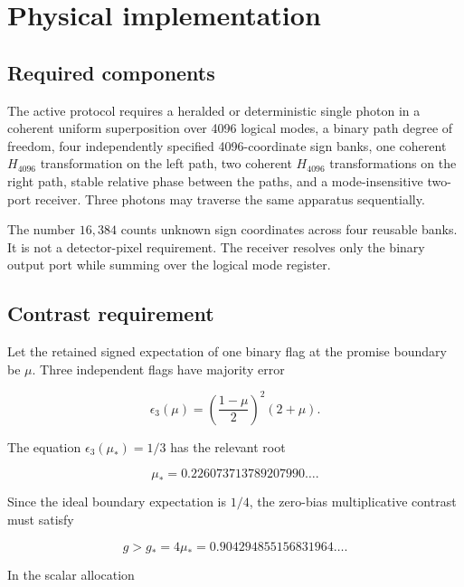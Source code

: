 \section{Physical implementation}
\label{sec:implementation}

\subsection{Required components}

The active protocol requires a heralded or deterministic single photon in a coherent uniform superposition over 4096 logical modes, a binary path degree of freedom, four independently specified 4096-coordinate sign banks, one coherent $H_{4096}$ transformation on the left path, two coherent $H_{4096}$ transformations on the right path, stable relative phase between the paths, and a mode-insensitive two-port receiver. Three photons may traverse the same apparatus sequentially.

The number $16{,}384$ counts unknown sign coordinates across four reusable banks. It is not a detector-pixel requirement. The receiver resolves only the binary output port while summing over the logical mode register.

\subsection{Contrast requirement}

Let the retained signed expectation of one binary flag at the promise boundary be $\mu$. Three independent flags have majority error

\begin{equation}
\epsilon_3(\mu)
=\left(\frac{1-\mu}{2}\right)^2(2+\mu).
\end{equation}

The equation $\epsilon_3(\mu_*)=1/3$ has the relevant root

\begin{equation}
\mu_*=0.226073713789207990\ldots.
\end{equation}

Since the ideal boundary expectation is $1/4$, the zero-bias multiplicative contrast must satisfy

\begin{equation}
g>g_*=4\mu_*
=0.904294855156831964\ldots.
\label{eq:implementation-contrast}
\end{equation}

In the scalar allocation

